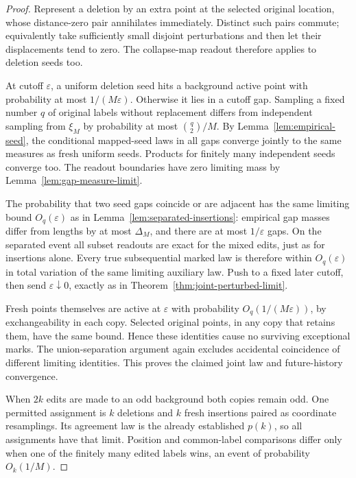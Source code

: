 \documentclass[11pt,letterpaper]{article}
\begin{document}
\begin{proof}
Represent a deletion by an extra point at the selected original
location, whose distance-zero pair annihilates immediately. Distinct
such pairs commute; equivalently take sufficiently small disjoint
perturbations and then let their displacements tend to zero.
The collapse-map readout therefore applies to deletion seeds too.

At cutoff $\varepsilon$, a uniform deletion seed hits a background
active point with probability at most $1/(M\varepsilon)$.
Otherwise it lies in a cutoff gap. Sampling a fixed number $q$ of
original labels without replacement differs from independent
sampling from $\xi_M$ by probability at most $\binom q2/M$.
By Lemma~\ref{lem:empirical-seed}, the conditional mapped-seed laws
in all gaps converge jointly to the same measures as fresh uniform
seeds. Products for finitely many independent seeds converge too.
The readout boundaries have zero limiting mass by
Lemma~\ref{lem:gap-measure-limit}.

The probability that two seed gaps coincide or are adjacent has the
same limiting bound $O_q(\varepsilon)$ as in
Lemma~\ref{lem:separated-insertions}: empirical gap masses differ
from lengths by at most $\Delta_M$, and there are at most
$1/\varepsilon$ gaps. On the separated event all subset readouts
are exact for the mixed edits, just as for insertions alone.
Every true subsequential marked law is therefore within
$O_q(\varepsilon)$ in total variation of the same limiting
auxiliary law. Push to a fixed later cutoff, then send
$\varepsilon\downarrow0$, exactly as in
Theorem~\ref{thm:joint-perturbed-limit}.

Fresh points themselves are active at $\varepsilon$ with probability
$O_q(1/(M\varepsilon))$, by exchangeability in each copy.
Selected original points, in any copy that retains them, have the same
bound. Hence these identities cause no surviving exceptional marks.
The union-separation argument again excludes accidental coincidence
of different limiting identities. This proves the claimed joint
law and future-history convergence.

When $2k$ edits are made to an odd background both copies remain
odd. One permitted assignment is $k$ deletions and $k$ fresh
insertions paired as coordinate resamplings. Its agreement law is
the already established $p(k)$, so all assignments have that limit.
Position and common-label comparisons differ only when one of the
finitely many edited labels wins, an event of probability $O_k(1/M)$.
\end{proof}
\end{document}

